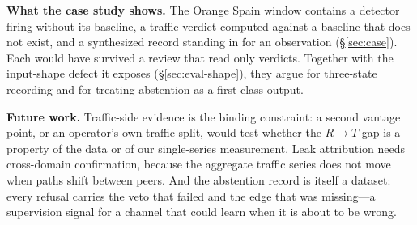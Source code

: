\textbf{What the case study shows.} The Orange Spain window contains a
detector firing without its baseline, a traffic verdict computed against a
baseline that does not exist, and a synthesized record standing in for an
observation (\S\ref{sec:case}). Each would have survived a review that
read only verdicts. Together with the input-shape defect it exposes
(\S\ref{sec:eval-shape}), they argue for three-state recording and for
treating abstention as a first-class output.

\textbf{Future work.} Traffic-side evidence is the binding constraint: a
second vantage point, or an operator's own traffic split, would test
whether the $R\to T$ gap is a property of the data or of our
single-series measurement. Leak attribution needs cross-domain
confirmation, because the aggregate traffic series does not move when
paths shift between peers. And the abstention record is itself a dataset:
every refusal carries the veto that failed and the edge that was
missing---a supervision signal for a channel that could learn when it is
about to be wrong.
